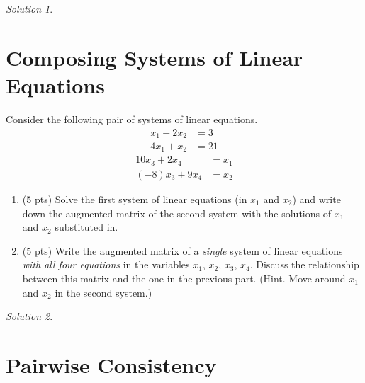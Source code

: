 \documentclass{article}
\theoremstyle{remark}
\newtheorem*{solution}{Solution}
\begin{document}
\begin{solution}
\end{solution}

\pagebreak
\section{Composing Systems of Linear Equations}

Consider the following pair of systems of linear equations.
\begin{align*}
  x_1 - 2x_2 &= 3 \\
  4x_1 + x_2 &= 21
\end{align*}
\begin{align*}
  10x_3 + 2x_4 &= x_1 \\
  (-8)x_3 + 9x_4 &= x_2
\end{align*}
\begin{enumerate}
\item (5 pts) Solve the first system of linear equations (in $x_1$ and $x_2$) and write down the augmented matrix of the second system with the solutions of $x_1$ and $x_2$ substituted in.
\item (5 pts) Write the augmented matrix of a \textit{single} system of linear equations \textit{with all four equations} in the variables $x_1$, $x_2$, $x_3$, $x_4$. Discuss the relationship between this matrix and the one in the previous part. (Hint. Move around $x_1$ and $x_2$ in the second system.)
\end{enumerate}

\begin{solution}
\end{solution}

\pagebreak
\section{Pairwise Consistency}
\end{document}
